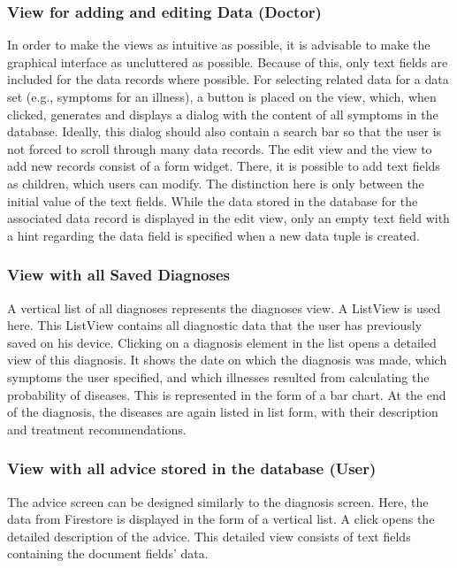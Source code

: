 \subsubsection{\textbf{View for adding and editing Data (Doctor)}}
In order to make the views as intuitive as possible, it is advisable to make the graphical interface as uncluttered as possible. Because of this, only text fields are included for the data records where possible. For selecting related data for a data set (e.g., symptoms for an illness), a button is placed on the view, which, when clicked, generates and displays a dialog with the content of all symptoms in the database. Ideally, this dialog should also contain a search bar so that the user is not forced to scroll through many data records. The edit view and the view to add new records consist of a form widget. There, it is possible to add text fields as children, which users can modify. The distinction here is only between the initial value of the text fields. While the data stored in the database for the associated data record is displayed in the edit view, only an empty text field with a hint regarding the data field is specified when a new data tuple is created.

\subsubsection{\textbf{View with all Saved Diagnoses}}
A vertical list of all diagnoses represents the diagnoses view. A ListView is used here. This ListView contains all diagnostic data that the user has previously saved on his device. Clicking on a diagnosis element in the list opens a detailed view of this diagnosis. It shows the date on which the diagnosis was made, which symptoms the user specified, and which illnesses resulted from calculating the probability of diseases. This is represented in the form of a bar chart. At the end of the diagnosis, the diseases are again listed in list form, with their description and treatment recommendations.

\subsubsection{\textbf{View with all advice stored in the database (User) }}
The advice screen can be designed similarly to the diagnosis screen. Here, the data from Firestore is displayed in the form of a vertical list. A click opens the detailed description of the advice. This detailed view consists of text fields containing the document fields' data.

